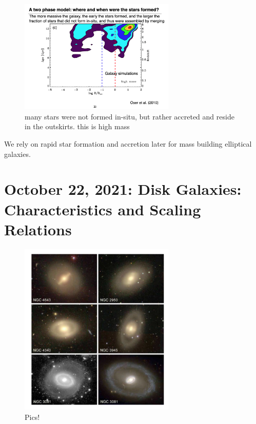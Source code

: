 \documentclass{article}
\begin{document}
\begin{figure}
    \centering
\includegraphics[width=0.66\textwidth]{figs/Screen Shot 2021-10-20 at 10.57.34 AM.png}
    \caption{many stars were not formed in-situ, but rather accreted and reside in the outskirts. this is high mass}
    \label{fig:outskrts}
\end{figure}

We rely on rapid star formation and accretion later for mass building elliptical galaxies.

\section{October 22, 2021: Disk Galaxies: Characteristics and Scaling Relations}

\begin{figure}
    \centering
    \includegraphics[width=0.66\textwidth]{figs/Screen Shot 2021-10-22 at 9.45.57 AM.png}
    \caption{Pics!}
    \label{fig:diskpics}
\end{figure}
\end{document}
